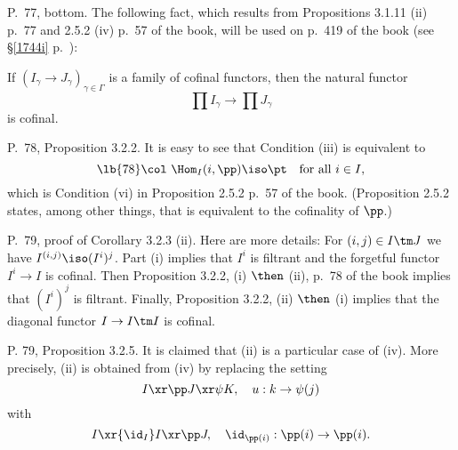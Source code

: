 \documentclass[12pt]{article}
\theoremstyle{remark}
\theoremstyle{definition}
\begin{document}
%

\begin{s}
P.~77, bottom. The following fact, which results from Propositions 3.1.11 (ii) p.~77 and 2.5.2 (iv) p.~57 of the book, will be used on p.~419 of the book (see \S\ref{1744i} p.~):

If $(I_\gamma\to J_\gamma)_{\gamma\in\Gamma}$ is a family of cofinal functors, then the natural functor 
$$
\prod I_\gamma\to\prod J_\gamma
$$ 
is cofinal. 
\end{s}

%

\begin{s} 
P.~78, Proposition 3.2.2. It is easy to see that Condition (iii) is equivalent to
%
\begin{equation}\lb{78} 
\col\ \Hom_I(i,\pp)\iso\pt\quad\text{for all }i\in I, 
\end{equation} 
%
which is Condition (vi) in Proposition 2.5.2 p.~57 of the book. (Proposition 2.5.2 states, among other things, that  is equivalent to the cofinality of $\pp$.)
\end{s}

%

\begin{s} 
P.~79, proof of Corollary 3.2.3 (ii). Here are more details: For $(i,j)\in I\tm J$ we have $I^{(i,j)}\iso(I^i)^j$. Part (i) implies that $I^i$ is filtrant and the forgetful functor $I^i\to I$ is cofinal. Then Proposition 3.2.2, (i) $\then$ (ii), p.~78 of the book implies that $(I^i)^j$ is filtrant. Finally, Proposition 3.2.2, (ii) $\then$ (i) implies that the diagonal functor $I\to I\tm I$ is cofinal.
\end{s}

%

\begin{s}
P. 79, Proposition 3.2.5. It is claimed that (ii) is a particular case of (iv). More precisely, (ii) is obtained from (iv) by replacing the setting 
$$
I\xr\pp J\xr\psi K,\quad u:k\to\psi(j)
$$ 
with 
$$
I\xr{\id_I}I\xr\pp J,\quad\id_{\pp(i)}:\pp(i)\to\pp(i).
$$ 
\end{s}

%
\end{document}

